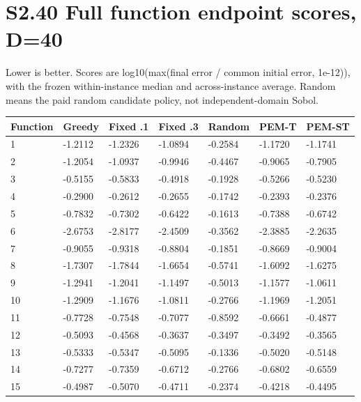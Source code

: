 \documentclass[11pt,a4paper]{article}
\begin{document}
\newpage

\hypertarget{s2.40-full-function-endpoint-scores-d40}{%
\section{S2.40 Full function endpoint scores,
D=40}\label{s2.40-full-function-endpoint-scores-d40}}

Lower is better. Scores are log10(max(final error / common initial
error, 1e-12)), with the frozen within-instance median and
across-instance average. Random means the paid random candidate policy,
not independent-domain Sobol.

\par\noindent\begin{minipage}{\linewidth}

\begin{longtable}[]{@{}lllllll@{}}
\toprule
Function & Greedy & Fixed .1 & Fixed .3 & Random & PEM-T & PEM-ST \\
\midrule
\endhead
1 & -1.2112 & -1.2326 & -1.0894 & -0.2584 & -1.1720 & -1.1741 \\
2 & -1.2054 & -1.0937 & -0.9946 & -0.4467 & -0.9065 & -0.7905 \\
3 & -0.5155 & -0.5833 & -0.4918 & -0.1928 & -0.5266 & -0.5230 \\
4 & -0.2900 & -0.2612 & -0.2655 & -0.1742 & -0.2393 & -0.2376 \\
5 & -0.7832 & -0.7302 & -0.6422 & -0.1613 & -0.7388 & -0.6742 \\
6 & -2.6753 & -2.8177 & -2.4509 & -0.3562 & -2.3885 & -2.2635 \\
7 & -0.9055 & -0.9318 & -0.8804 & -0.1851 & -0.8669 & -0.9004 \\
8 & -1.7307 & -1.7844 & -1.6654 & -0.5741 & -1.6092 & -1.6275 \\
9 & -1.2941 & -1.2041 & -1.1497 & -0.5013 & -1.1577 & -1.0611 \\
10 & -1.2909 & -1.1676 & -1.0811 & -0.2766 & -1.1969 & -1.2051 \\
11 & -0.7728 & -0.7548 & -0.7077 & -0.8592 & -0.6661 & -0.4877 \\
12 & -0.5093 & -0.4568 & -0.3637 & -0.3497 & -0.3492 & -0.3565 \\
13 & -0.5333 & -0.5347 & -0.5095 & -0.1336 & -0.5020 & -0.5148 \\
14 & -0.7277 & -0.7359 & -0.6712 & -0.2766 & -0.6802 & -0.6559 \\
15 & -0.4987 & -0.5070 & -0.4711 & -0.2374 & -0.4218 & -0.4495 \\

\end{longtable}
\end{minipage}
\end{document}
